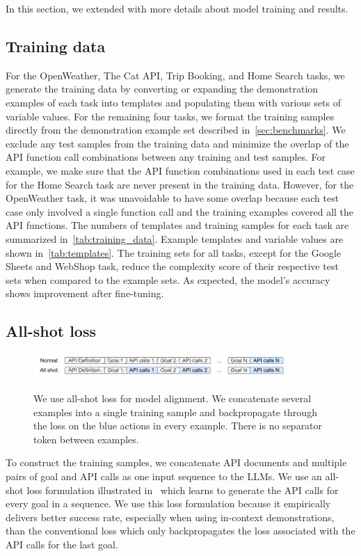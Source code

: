 In this section, we extended  with more details about model training and results.


\subsection{Training data}\label{sec:training_data_section}



For the OpenWeather, The Cat API, Trip Booking, and Home Search tasks, we generate the training data by converting or expanding the demonstration examples of each task into templates and populating them with various sets of variable values. For the remaining four tasks, we format the training samples directly from the demonstration example set described in~\cref{sec:benchmarks}. We exclude any test samples from the training data and minimize the overlap of the API function call combinations between any training and test samples. For example, we make sure that the API function combinations used in each test case for the Home Search task are never present in the training data. However, for the OpenWeather task, it was unavoidable to have some overlap because each test case only involved a single function call and the training examples covered all the API functions. The numbers of templates and training samples for each task are summarized in~\cref{tab:training_data}. Example templates and variable values are shown in~\cref{tab:templates}. The training sets for all tasks, except for the Google Sheets and WebShop task, reduce the complexity score of their respective test sets when compared to the example sets. As expected, the model's accuracy shows improvement after fine-tuning.




\subsection{All-shot loss}
\begin{figure}[h]
\caption{We use all-shot loss for model alignment. We concatenate several examples into a single training sample and backpropagate through the loss on the blue actions in every example. There is no separator token between examples.
}
\centering
\vspace{-8pt}
\includegraphics[width=0.85\textwidth]{plots/all_shot.pdf}
\label{fig:all_shot}
\end{figure}
To construct the training samples, we concatenate API documents and multiple pairs of goal and API calls as one input sequence to the LLMs. We use an all-shot loss formulation illustrated in~ which learns to generate the API calls for every goal in a sequence.
We use this loss formulation because it empirically delivers better success rate, especially when using in-context demonstrations, than the conventional loss which only backpropagates the loss associated with the API calls for the last goal.

